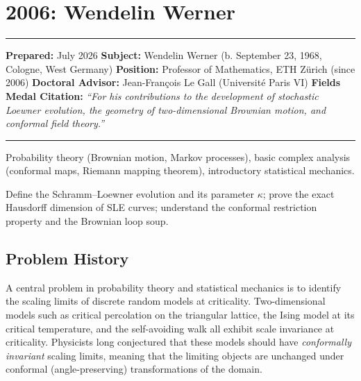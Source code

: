 \chapter{2006: Wendelin Werner}\label{ch2006wendelinwerner:wendelin-werner-fields-medal-2006-a-comprehensive-report-on-his-work-and-impact}

\begin{center}\rule{0.5\linewidth}{0.5pt}\end{center}

\textbf{Prepared:} July 2026 \textbf{Subject:} Wendelin Werner (b. September 23, 1968, Cologne, West Germany) \textbf{Position:} Professor of Mathematics, ETH Zürich (since 2006) \textbf{Doctoral Advisor:} Jean-François Le Gall (Université Paris VI) \textbf{Fields Medal Citation:} \emph{``For his contributions to the development of stochastic Loewner evolution, the geometry of two-dimensional Brownian motion, and conformal field theory.''}

\begin{center}\rule{0.5\linewidth}{0.5pt}\end{center}

\begin{prereqs} Probability theory (Brownian motion, Markov processes), basic complex analysis (conformal maps, Riemann mapping theorem), introductory statistical mechanics. \end{prereqs}

\begin{objectives} Define the Schramm--Loewner evolution and its parameter $\kappa$; prove the exact Hausdorff dimension of SLE curves; understand the conformal restriction property and the Brownian loop soup. \end{objectives}

\section{Problem History}\label{ch2006wendelinwerner:problem-history}

A central problem in probability theory and statistical mechanics is to identify the scaling limits of discrete random models at criticality. Two-dimensional models such as critical percolation on the triangular lattice, the Ising model at its critical temperature, and the self-avoiding walk all exhibit scale invariance at criticality. Physicists long conjectured that these models should have \emph{conformally invariant} scaling limits, meaning that the limiting objects are unchanged under conformal (angle-preserving) transformations of the domain.

